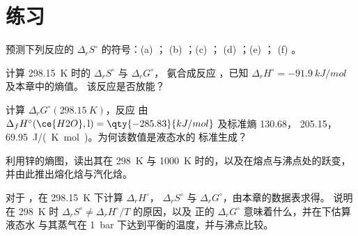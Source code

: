 \section{练习}

\begin{exercise}[$\star$]\label{exo:b2:reaction-free-energy:1}
预测下列反应的 $\Delta_r S^\circ$ 的符号：(a) ；
(b) ；(c) ；
(d) ；(e) ；
(f) 。
\end{exercise}

\begin{exercise}[$\star$]\label{exo:b2:reaction-free-energy:2}
计算 \qty{298.15}{K} 时的 $\Delta_r S^\circ$ 与 $\Delta_r G^\circ$，
氨合成反应 ，已知 $\Delta_r
H^\circ = \qty{-91.9}{kJ/mol}$ 及本章中的熵值。
该反应是否放能？
\end{exercise}

\begin{exercise}[$\star$]\label{exo:b2:reaction-free-energy:3}
计算 $\Delta_r G^\circ(\qty{298.15}{K})$，反应  由 $\Delta_f H^\circ(\ce{H2O}, \text{l}) = \qty{-285.83}{kJ/mol}$
及标准熵  130.68， 205.15，
 \qty{69.95}{J/(K.mol)}。为何该数值是液态水的
标准生成？
\end{exercise}

\begin{exercise}[$\star$]\label{exo:b2:reaction-free-energy:4}
利用锌的熵图，读出其在
\qty{298}{K} 与 \qty{1000}{K} 时的，以及在熔点与沸点处的跃变，
并由此推出熔化焓与汽化焓。
\end{exercise}

\begin{exercise}[$\star\star$]\label{exo:b2:reaction-free-energy:5}
对于 ，在 \qty{298.15}{K} 下计算 $\Delta_r H^\circ$，
$\Delta_r S^\circ$ 与 $\Delta_r G^\circ$，由本章的数据表求得。
说明在 \qty{298}{K} 时 $\Delta_r S^\circ \neq \Delta_r H^\circ/T$ 的原因，以及
正的 $\Delta_r G^\circ$ 意味着什么，并在下估算液态水
与其蒸气在
\qty{1}{bar} 下达到平衡的温度，并与沸点比较。
\end{exercise}

